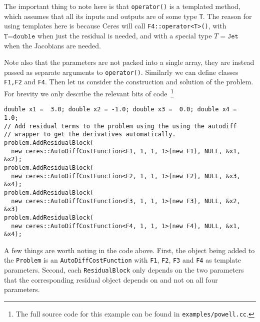 The important thing to note here is that \texttt{operator()} is a
templated method, which assumes that all its inputs and outputs are of
some type \texttt{T}. The reason for using templates here is because Ceres will call \texttt{F4::operator<T>()}, with $\texttt{T=double}$ when just the residual is needed, and with a special type $T=\texttt{Jet}$ when the Jacobians are needed.

Note also that the parameters are not packed
into a single array, they are instead passed as separate arguments to
\texttt{operator()}. Similarly we can define classes \texttt{F1,F2}
and \texttt{F4}.  Then let us consider the construction and solution of the problem. For brevity we only describe the relevant bits of code~\footnote{The full source code for this example can be found in \texttt{examples/powell.cc}.}
\begin{verbatim}
double x1 =  3.0; double x2 = -1.0; double x3 =  0.0; double x4 =  1.0;
// Add residual terms to the problem using the using the autodiff
// wrapper to get the derivatives automatically.
problem.AddResidualBlock(
  new ceres::AutoDiffCostFunction<F1, 1, 1, 1>(new F1), NULL, &x1, &x2);
problem.AddResidualBlock(
  new ceres::AutoDiffCostFunction<F2, 1, 1, 1>(new F2), NULL, &x3, &x4);
problem.AddResidualBlock(
  new ceres::AutoDiffCostFunction<F3, 1, 1, 1>(new F3), NULL, &x2, &x3)
problem.AddResidualBlock(
  new ceres::AutoDiffCostFunction<F4, 1, 1, 1>(new F4), NULL, &x1, &x4);
\end{verbatim}
A few things are worth noting in the code above. First, the object
being added to the \texttt{Problem} is an
\texttt{AutoDiffCostFunction} with \texttt{F1}, \texttt{F2}, \texttt{F3} and \texttt{F4} as template parameters. Second, each \texttt{ResidualBlock} only depends on the two parameters that the corresponding residual object depends on and not on all four parameters.


